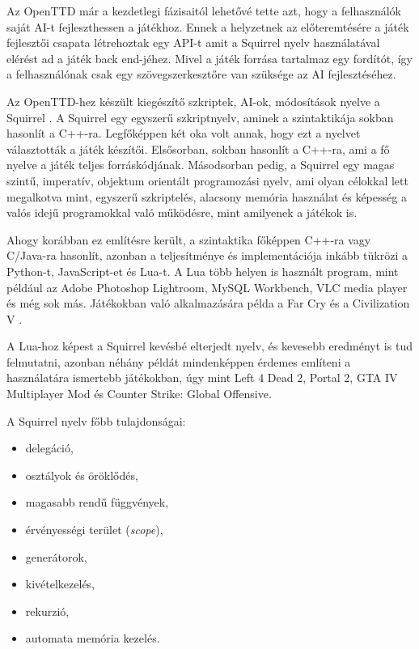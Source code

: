 
Az OpenTTD már a kezdetlegi fázisaitól lehetővé tette azt, hogy a felhasználók saját AI-t fejleszthessen a játékhoz. Ennek a helyzetnek az előteremtésére a játék fejlesztői csapata létrehoztak egy API-t amit a Squirrel nyelv használatával elérést ad a játék back end-jéhez. Mivel a játék forrása tartalmaz egy fordítót, így a felhasználónak csak egy szövegszerkesztőre van szüksége az AI fejlesztéséhez.


Az OpenTTD-hez készült kiegészítő szkriptek, AI-ok, módosítások nyelve a Squirrel \cite{squirrel}. A Squirrel egy egyszerű szkriptnyelv, aminek a szintaktikája sokban hasonlít a C++-ra. Legfőképpen két oka volt annak, hogy ezt a nyelvet választották a játék készítői. Elsősorban, sokban hasonlít a C++-ra, ami a fő nyelve a játék teljes forráskódjának. Másodsorban pedig, a Squirrel egy magas szintű,  imperatív, objektum orientált programozási nyelv, ami olyan célokkal lett megalkotva mint, egyszerű szkriptelés, alacsony memória használat és képesség a valós idejű programokkal való működésre, mint amilyenek a játékok is.

Ahogy korábban ez említésre került, a szintaktika főképpen C++-ra vagy C/Java-ra hasonlít, azonban a teljesítménye és implementációja inkább tükrözi a Python-t, JavaScript-et és Lua-t. A Lua több helyen is használt program, mint például az Adobe Photoshop Lightroom, MySQL Workbench, VLC media player és még sok más. Játékokban való alkalmazására példa a Far Cry és a Civilization V \cite{ierusalimschy2006programming}.

A Lua-hoz képest a Squirrel kevésbé elterjedt nyelv, és kevesebb eredményt is tud felmutatni, azonban néhány példát mindenképpen érdemes említeni a használatára ismertebb játékokban, úgy mint Left 4 Dead 2, Portal 2, GTA IV Multiplayer Mod és Counter Strike: Global Offensive.

A Squirrel nyelv főbb tulajdonságai:
\begin{itemize}
	\item delegáció,
	\item osztályok és öröklődés,
	\item magasabb rendű függvények,
	\item érvényességi terület (\textit{scope}),
	\item generátorok,
	\item kivételkezelés,
	\item rekurzió,
	\item automata memória kezelés.
\end{itemize}

